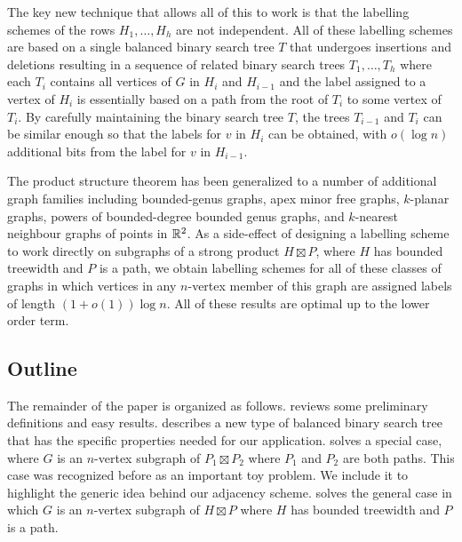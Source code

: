 \documentclass[kpfonts]{patmorin}
\begin{document}
The key new technique that allows all of this to work is that the labelling schemes of the rows $H_1,\ldots,H_h$ are not independent.  All of these labelling schemes are based on a single balanced binary search tree $T$ that undergoes insertions and deletions resulting in a sequence of related binary search trees $T_1,\ldots,T_h$ where each $T_i$ contains all vertices of $G$ in $H_{i}$ and $H_{i-1}$ and the label assigned to a vertex of $H_i$ is essentially based on a path from the root of $T_i$ to some vertex of $T_i$.  By carefully maintaining the binary search tree $T$, the trees $T_{i-1}$ and $T_{i}$ can be similar enough so that the labels for $v$ in $H_i$ can be obtained, with $o(\log n)$ additional bits from the label for $v$ in $H_{i-1}$.

The product structure theorem has been generalized to a number of additional graph families including bounded-genus graphs, apex minor free graphs, $k$-planar graphs, powers of bounded-degree bounded genus graphs, and $k$-nearest neighbour graphs of points in $\mathbb{R}^2$. As a side-effect of designing a labelling scheme to work directly on subgraphs of a strong product $H\boxtimes P$, 
where $H$ has bounded treewidth and $P$ is a path, 
we obtain labelling schemes for all of these classes of graphs in which vertices in any $n$-vertex member of this graph are assigned labels of length $(1+o(1))\log n$.  All of these results are optimal up to the lower order term.

\subsection{Outline}

The remainder of the paper is organized as follows.  reviews some preliminary definitions and easy results.   describes a new type of balanced binary search tree that has the specific properties needed for our application.  solves a special case, where $G$ is an $n$-vertex subgraph of $P_1\boxtimes P_2$ where $P_1$ and $P_2$ are both paths.  
This case was recognized before as an important toy problem. We include it to highlight the generic idea behind our adjacency scheme.  solves the general case in which $G$ is an $n$-vertex subgraph of $H\boxtimes P$ where $H$ has bounded treewidth and $P$ is a path.  
\end{document}
